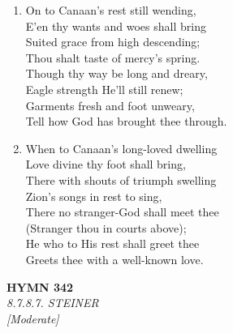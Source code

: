 \begin{enumerate}
    \item On to Canaan's rest still wending, \\
        E'en thy wants and woes shall bring \\
        Suited grace from high descending; \\
        Thou shalt taste of mercy's spring. \\
        Though thy way be long and dreary, \\
        Eagle strength He'll still renew; \\
        Garments fresh and foot unweary, \\
        Tell how God has brought thee through.

    \item When to Canaan's long-loved dwelling \\
        Love divine thy foot shall bring, \\
        There with shouts of triumph swelling \\
        Zion's songs in rest to sing, \\
        There no stranger-God shall meet thee \\
        (Stranger thou in courts above); \\
        He who to His rest shall greet thee \\
        Greets thee with a well-known love.

\end{enumerate}

\newpage
\begin{center}
    {\Large \textbf{HYMN 342}}
    \\
    \textit{8.7.8.7. STEINER}
    \\
    \textit{\small [Moderate]}
\end{center}
\vspace{1em}

